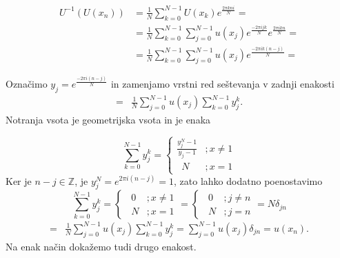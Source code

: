 \documentclass[mat2, tisk]{fmfdelo}
\newcommand{\Z}{\mathbb Z}
\begin{document}
\begin{dokaz}
\begin{align*}
  U^{-1}(U(x_n)) &= \frac{1}{N}\sum_{k=0}^{N-1} U(x_k) e^{\frac{2\pi k n i}{N}} = \\
  &= \frac{1}{N}\sum_{k=0}^{N-1} \sum_{j=0}^{N-1} u(x_j) e^{\frac{-2\pi i j k}{N}} e^{\frac{2\pi i k n }{N}} = \\
  &= \frac{1}{N}\sum_{k=0}^{N-1} \sum_{j=0}^{N-1} u(x_j) e^{\frac{-2\pi i k(n - j)}{N}} = 
\end{align*}

Označimo $y_j = e^{\frac{-2\pi i (n-j)}{N}}$ in zamenjamo vrstni red seštevanja v 
zadnji enakosti 
\begin{align*}
=& \frac{1}{N}\sum_{j=0}^{N-1} u(x_j)\sum_{k=0}^{N-1} y_j^k .
\end{align*}
Notranja vsota je geometrijska vsota in je enaka

\[ 
  \sum_{k=0}^{N-1} y_j^k = \begin{cases} 
      \frac{y_j^N - 1}{y_j - 1} &; x\neq 1 \\
      \,\,\,N &; x = 1 
   \end{cases}
\]
Ker je $n-j \in \Z$, je $y_j^N = e^{2\pi i(n-j)} = 1$, zato lahko dodatno
poenostavimo  
\[ 
  \sum_{k=0}^{N-1} y_j^k = \begin{cases} 
      \,\,\,0 &; x\neq 1 \\
      \,\,\,N &; x = 1 
   \end{cases}
   = 
   \begin{cases} 
    \,\,\,0 &; j\neq n \\
    \,\,\,N &; j=n 
 \end{cases}
 = N\delta_{jn}
\]
\begin{align*}
  =& \frac{1}{N}\sum_{j=0}^{N-1} u(x_j)\sum_{k=0}^{N-1} y_j^k = \sum_{j=0}^{N-1} u(x_j) \delta_{jn} = u(x_n). 
\end{align*}
Na enak način dokažemo tudi drugo enakost.
\end{dokaz}
\end{document}
